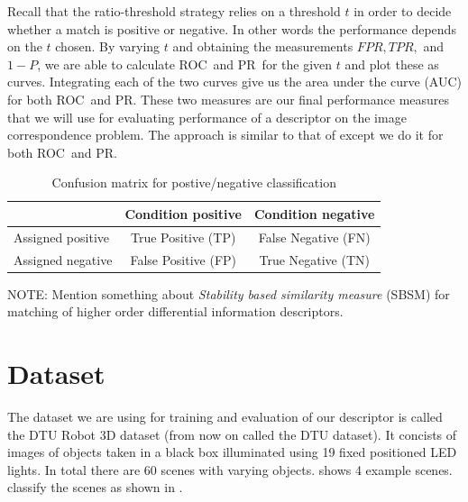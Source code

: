 \documentclass[thesis.tex]{subfiles}
\newcommand\TPR{\mathit{TPR}}
\newcommand\FPR{\mathit{FPR}}
\newcommand\OMP{\mathit{1-P}}
\newcommand\ROC{ROC}
\newcommand\PR{PR}
\begin{document}
Recall that the ratio-threshold strategy relies on a threshold $t$ in order to decide whether a match is positive or negative. In other words the performance depends on the $t$ chosen. By varying $t$ and obtaining the measurements $\FPR,\TPR,$ and $\OMP$, we are able to calculate \ROC\ and \PR\ for the given $t$ and plot these as curves. Integrating each of the two curves give us the area under the curve (AUC) for both \ROC\ and \PR. These two measures are our final performance measures that we will use for evaluating performance of a descriptor on the image correspondence problem. The approach is similar to that of \citet{dahl2011finding} except we do it for both \ROC\ and \PR.


\begin{table}
	\centering
	\bgroup
	\def\arraystretch{1.5}
	\begin{tabular}{|l|c|c|}
		\cline{2-3}
		\multicolumn{1}{c|}{} & Condition positive & Condition negative \\ \hline
		Assigned positive & \cellcolor{green!25}True Positive (TP) & \cellcolor{red!25}False Negative (FN)  \\ \hline
		Assigned negative & \cellcolor{red!25}False Positive (FP) & \cellcolor{green!25}True Negative (TN) \\ \hline
	\end{tabular}
	\egroup
	\caption{Confusion matrix for postive/negative classification}
	\label{tbl:confusion_matrix}
\end{table}

NOTE: Mention something about
\emph{Stability based similarity measure} (SBSM) \cite{balmashnova2008novel} for matching of higher order differential information descriptors.

\section{Dataset}
The dataset we are using for training and evaluation of our descriptor is called the DTU Robot 3D dataset \cite{aanaes2010recall} (from now on called the DTU dataset). It concists of images of objects taken in a black box illuminated using 19 fixed positioned LED lights. In total there are 60 scenes with varying objects.  shows 4 example scenes. \citet{aanaes2010ground} classify the scenes as shown in .
\end{document}
